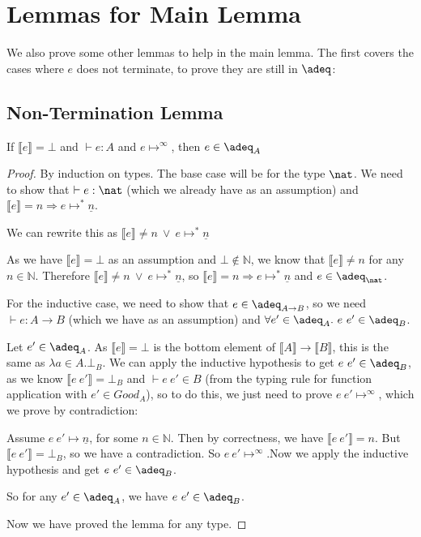 \section{Lemmas for Main Lemma}
We also prove some other lemmas to help in the main lemma. The first covers the cases where $e$ does not terminate, to prove they are still in $\adeq$:

\subsection{Non-Termination Lemma}
\begin{lem}\label{infinite}
If $\llbracket e \rrbracket = \bot$ and $\vdash e : A$ and $e \mapsto^{\infty}$, then $e \in \adeq_A$
\end{lem}

\begin{proof}
By induction on types. The base case will be for the type $\nat$. We need to show that $\vdash e : \nat$ (which we already have as an assumption) and $\llbracket e \rrbracket = n \Rightarrow e \mapsto^* \underline{n}$. 

We can rewrite this as $\llbracket e \rrbracket \neq n \ \vee \ e \mapsto^* \underline{n}$

As we have $\llbracket e \rrbracket = \bot$ as an assumption and $\bot \notin \mathbb{N}$, we know that $\llbracket e \rrbracket \neq n$ for any $n \in \mathbb{N}$. Therefore $\llbracket e \rrbracket \neq n \ \vee \ e \mapsto^* \underline{n}$, so $\llbracket e \rrbracket = n \Rightarrow e \mapsto^* \underline{n}$ and $e \in \adeq_{\nat}$.  

For the inductive case, we need to show that $e \in \adeq_{A \to B}$, so we need $\vdash e : A \to B$ (which we have as an assumption) and $\forall e' \in \adeq_A. \ e \ e' \in \adeq_B$.

Let $e' \in \adeq_A$. As $\llbracket e \rrbracket = \bot$ is the bottom element of $\llbracket A \rrbracket \to \llbracket B \rrbracket$, this is the same as $\lambda a \in A. \bot_B$.  We can apply the inductive hypothesis to get $e \ e' \in \adeq_B$, as we know $\llbracket e \ e' \rrbracket = \bot_B$ and $\vdash e \ e' \in B$ (from the typing rule for function application with $e' \in Good_A$), so to do this, we just need to prove $e \ e' \mapsto^{\infty}$, which we prove by contradiction:

Assume $e \ e' \mapsto \underline{n}$, for some $n \in \mathbb{N}$. Then by correctness, we have $\llbracket e \ e' \rrbracket = n$. But $\llbracket
e \ e' \rrbracket = \bot_B$, so we have a contradiction. So $e \ e' \mapsto^{\infty}$.Now we apply the inductive hypothesis and get $e \ e' \in \adeq_B$. 

So for any $e' \in \adeq_A$, we have $e \ e' \in \adeq_B$.

Now we have proved the lemma for any type.
\end{proof}

